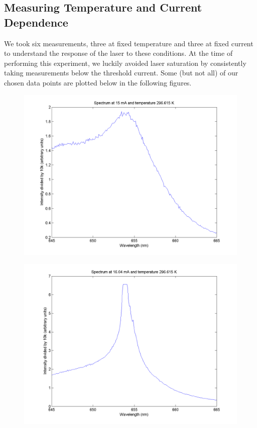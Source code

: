 \documentclass[10pt,a4paper]{article}
\begin{document}
\subsection*{Measuring Temperature and Current Dependence}
We took six measurements, three at fixed temperature and three at fixed current to understand the response of the laser to these conditions. At the time of performing this experiment, we luckily avoided laser saturation by consistently taking measurements below the threshold current. Some (but not all) of our chosen data points are plotted below in the following figures.
\begin{figure}[H]
\centering
\includegraphics[scale = 0.5]{../Analysis/15mAT10p643.png}
\end{figure} 
\begin{figure}[H]
\centering
\includegraphics[scale = 0.5]{../Analysis/16p04mAT10p643.png}
\end{figure} 
\end{document}
